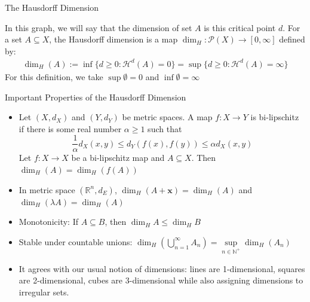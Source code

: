 \documentclass{beamer}
\begin{document}
\begin{frame}{The Hausdorff Dimension}
\begin{center}
\begin{tikzpicture}[font=\sffamily, scale = 0.5]
\end{tikzpicture}

      \end{center}  
In this graph, we will say that the dimension of set $A$ is this critical point $d$. 
    For a set $A \subseteq X$, the Hausdorff dimension is a map $\dim_H : \mathcal{P}(X) \to [0,\infty]$ defined by:
        \begin{align*}
            \dim_H(A) := \inf\{d \geq 0 : \mathcal{H}^d(A) = 0\} = \sup\{d \geq 0 : \mathcal{H}^d(A) = \infty\}
        \end{align*}
        For this definition, we take $\sup \emptyset =0$ and $\inf \emptyset = \infty$

\end{frame}

\begin{frame}{Important Properties of the Hausdorff Dimension}
\begin{itemize}
    \item Let $(X,d_X)$ and $(Y, d_Y)$ be metric spaces. A map $f: X\to Y$ is bi-lipschitz if there is some real number $\alpha \ge 1$ such that \[\frac{1}{\alpha} d_X(x,y)\le d_Y(f(x), f(y))\le \alpha d_X(x,y)\]Let $f: X \to X$ be a bi-lipschitz map and $A \subseteq X$. Then $\dim _H(A) = \dim _H (f(A))$
    \item In metric space $(\mathbb{R}^n, d_E)$, $\dim_H (A + \mathbf{x}) = \dim _H(A)$ and $\dim_H (\lambda A) = \dim _H(A)$
    \item Monotonicity: If $A \subseteq B$, then $\dim _H A \le \dim _H B$
    \item Stable under countable unions: $\dim _H \left ( \bigcup \limits _{n=1}^{\infty} A_n \right) = \sup \limits _{n \in \mathbb{N}^+} \dim _H(A_n)$
    \item It agrees with our usual notion of dimensions: lines are 1-dimensional, squares are 2-dimensional, cubes are 3-dimensional while also assigning dimensions to irregular sets.
\end{itemize}
\end{frame}

\end{document}
